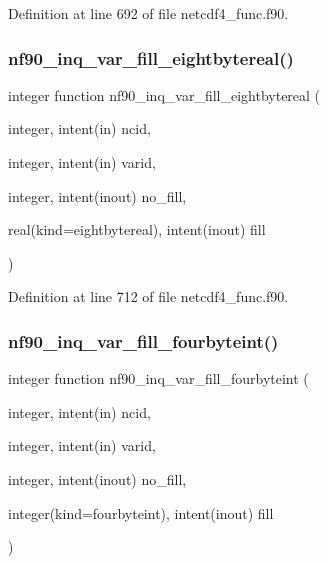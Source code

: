 Definition at line 692 of file netcdf4\+\_\+func.\+f90.

\mbox{\label{netcdf4__func_8f90_a618852b8c0460f36c938fc79c762121c}} 
\subsubsection{\texorpdfstring{nf90\+\_\+inq\+\_\+var\+\_\+fill\+\_\+eightbytereal()}{nf90\_inq\_var\_fill\_eightbytereal()}}
{\footnotesize\ttfamily integer function nf90\+\_\+inq\+\_\+var\+\_\+fill\+\_\+eightbytereal (\begin{DoxyParamCaption}\item[{integer, intent(in)}]{ncid,  }\item[{integer, intent(in)}]{varid,  }\item[{integer, intent(inout)}]{no\+\_\+fill,  }\item[{real(kind=eightbytereal), intent(inout)}]{fill }\end{DoxyParamCaption})}



Definition at line 712 of file netcdf4\+\_\+func.\+f90.

\mbox{\label{netcdf4__func_8f90_a78fc23edbe2513932eb29398db0799cd}} 
\subsubsection{\texorpdfstring{nf90\+\_\+inq\+\_\+var\+\_\+fill\+\_\+fourbyteint()}{nf90\_inq\_var\_fill\_fourbyteint()}}
{\footnotesize\ttfamily integer function nf90\+\_\+inq\+\_\+var\+\_\+fill\+\_\+fourbyteint (\begin{DoxyParamCaption}\item[{integer, intent(in)}]{ncid,  }\item[{integer, intent(in)}]{varid,  }\item[{integer, intent(inout)}]{no\+\_\+fill,  }\item[{integer(kind=fourbyteint), intent(inout)}]{fill }\end{DoxyParamCaption})}



